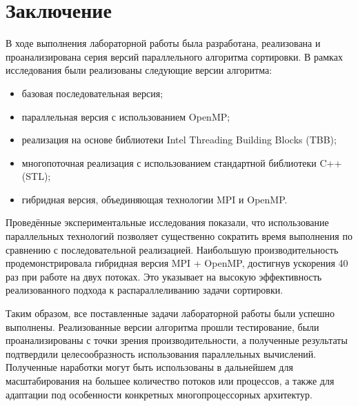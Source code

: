 \documentclass[a4paper,12pt]{article}
\begin{document}
\section{Заключение}
В ходе выполнения лабораторной работы была разработана, реализована и проанализирована серия версий параллельного алгоритма сортировки. В рамках исследования были реализованы следующие версии алгоритма:
\begin{itemize}
    \item базовая последовательная версия;
    \item параллельная версия с использованием OpenMP;
    \item реализация на основе библиотеки Intel Threading Building Blocks (TBB);
    \item многопоточная реализация с использованием стандартной библиотеки C++ (STL);
    \item гибридная версия, объединяющая технологии MPI и OpenMP.
\end{itemize}
Проведённые экспериментальные исследования показали, что использование параллельных технологий позволяет существенно сократить время выполнения по сравнению с последовательной реализацией. Наибольшую производительность продемонстрировала гибридная версия MPI + OpenMP, достигнув ускорения 40 раз при работе на двух потоках. Это указывает на высокую эффективность реализованного подхода к распараллеливанию задачи сортировки.

Таким образом, все поставленные задачи лабораторной работы были успешно выполнены. Реализованные версии алгоритма прошли тестирование, были проанализированы с точки зрения производительности, а полученные результаты подтвердили целесообразность использования параллельных вычислений. Полученные наработки могут быть использованы в дальнейшем для масштабирования на большее количество потоков или процессов, а также для адаптации под особенности конкретных многопроцессорных архитектур.
\newpage
\end{document}

